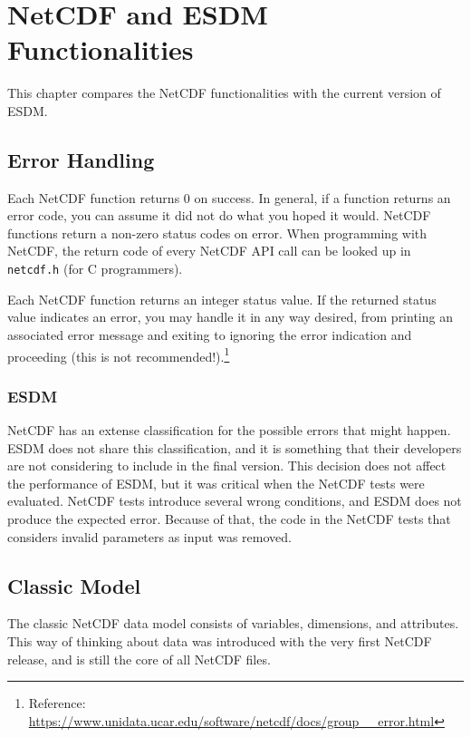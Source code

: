 \chapter{NetCDF and ESDM Functionalities}
\label{ch:func}


This chapter compares the NetCDF functionalities with the current version of ESDM.

\section{Error Handling}


Each NetCDF function returns 0 on success. In general, if a function returns an error code, you can assume it did not do what you hoped it would. NetCDF functions return a non-zero status codes on error. When programming with NetCDF, the return code of every NetCDF API call can be looked up in \texttt{netcdf.h} (for C programmers).

Each NetCDF function returns an integer status value. If the returned status value indicates an error, you may handle it in any way desired, from printing an associated error message and exiting to ignoring the error indication and proceeding (this is not recommended!).\footnote{Reference: \url{https://www.unidata.ucar.edu/software/netcdf/docs/group__error.html}}

\subsection{ESDM}


NetCDF has an extense classification for the possible errors that might happen. ESDM does not share this classification, and it is something that their developers are not considering to include in the final version. This decision does not affect the performance of ESDM, but it was critical when the NetCDF tests were evaluated. NetCDF tests introduce several wrong conditions, and ESDM does not produce the expected error. Because of that, the code in the NetCDF tests that considers invalid parameters as input was removed.

\section{Classic Model}

The classic NetCDF data model consists of variables, dimensions, and attributes. This way of thinking about data was introduced with the very first NetCDF release, and is still the core of all NetCDF files.

